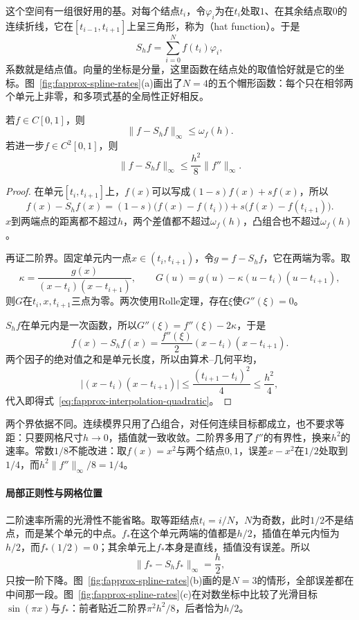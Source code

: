 这个空间有一组很好用的基。对每个结点$t_i$，令$\varphi_i$为在$t_i$处取$1$、在其余结点取$0$的连续折线，它在$[t_{i-1},t_{i+1}]$上呈三角形，称为（hat function）。于是
\[
 S_hf=\sum_{i=0}^Nf(t_i)\varphi_i ,
\]
系数就是结点值。向量的坐标是分量，这里函数在结点处的取值恰好就是它的坐标。图~\ref{fig:fapprox-spline-rates}(a)画出了$N=4$的五个帽形函数：每个只在相邻两个单元上非零，和多项式基的全局性正好相反。

\begin{theorem}[分段线性插值的误差]
\label{thm:fapprox-linear-interpolation}
若$f\in C[0,1]$，则
\begin{equation}
 \lVert f-S_hf\rVert_\infty\leq\omega_f(h).
 \label{eq:fapprox-interpolation-modulus}
\end{equation}
若进一步$f\in C^2[0,1]$，则
\begin{equation}
 \lVert f-S_hf\rVert_\infty\leq\frac{h^2}8\lVert f''\rVert_\infty .
 \label{eq:fapprox-interpolation-quadratic}
\end{equation}
\end{theorem}

\begin{proof}
在单元$[t_i,t_{i+1}]$上，$f(x)$可以写成$(1-s)f(x)+sf(x)$，所以
\[
 f(x)-S_hf(x)=(1-s)\bigl(f(x)-f(t_i)\bigr)+s\bigl(f(x)-f(t_{i+1})\bigr).
\]
$x$到两端点的距离都不超过$h$，两个差值都不超过$\omega_f(h)$，凸组合也不超过$\omega_f(h)$。

再证二阶界。固定单元内一点$x\in(t_i,t_{i+1})$，令$g=f-S_hf$，它在两端为零。取
\[
 \kappa=\frac{g(x)}{(x-t_i)(x-t_{i+1})},\qquad G(u)=g(u)-\kappa(u-t_i)(u-t_{i+1}),
\]
则$G$在$t_i,x,t_{i+1}$三点为零。两次使用Rolle定理，存在$\xi$使$G''(\xi)=0$。

$S_hf$在单元内是一次函数，所以$G''(\xi)=f''(\xi)-2\kappa$，于是
\[
 f(x)-S_hf(x)=\frac{f''(\xi)}2(x-t_i)(x-t_{i+1}).
\]
两个因子的绝对值之和是单元长度，所以由算术--几何平均，
\[
 \lvert(x-t_i)(x-t_{i+1})\rvert\leq\frac{(t_{i+1}-t_i)^2}4\leq\frac{h^2}4 ,
\]
代入即得式~\eqref{eq:fapprox-interpolation-quadratic}。
\end{proof}

两个界依据不同。连续模界只用了凸组合，对任何连续目标都成立，也不要求等距：只要网格尺寸$h\to0$，插值就一致收敛。二阶界多用了$f''$的有界性，换来$h^2$的速率。常数$1/8$不能改进：取$f(x)=x^2$与两个结点$0,1$，误差$x-x^2$在$1/2$处取到$1/4$，而$h^2\lVert f''\rVert_\infty/8=1/4$。

\paragraph{局部正则性与网格位置}
二阶速率所需的光滑性不能省略。取等距结点$t_i=i/N$，$N$为奇数，此时$1/2$不是结点，而是某个单元的中点。$f_*$在这个单元两端的值都是$h/2$，插值在单元内恒为$h/2$，而$f_*(1/2)=0$；其余单元上$f_*$本身是直线，插值没有误差。所以
\[
 \lVert f_*-S_hf_*\rVert_\infty=\frac h2 ,
\]
只按一阶下降。图~\ref{fig:fapprox-spline-rates}(b)画的是$N=3$的情形，全部误差都在中间那一段。图~\ref{fig:fapprox-spline-rates}(c)在对数坐标中比较了光滑目标$\sin(\pi x)$与$f_*$：前者贴近二阶界$\pi^2h^2/8$，后者恰为$h/2$。

